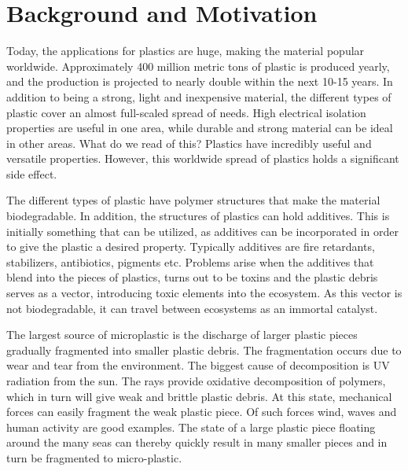 \section{Background and Motivation}


Today, the applications for plastics are huge, making the material popular worldwide. %
Approximately 400 million metric tons of plastic is produced yearly, and the production is projected to nearly double within the next 10-15 years. %
In addition to being a strong, light and inexpensive material, the different types of plastic cover an almost full-scaled spread of needs. High electrical isolation properties are useful in one area, while durable and strong material can be ideal in other areas. What do we read of this? Plastics have incredibly useful and versatile properties. However, this worldwide spread of plastics holds a significant side effect. 

The different types of plastic have polymer structures that make the material biodegradable. In addition, the structures of plastics can hold additives. This is initially something that can be utilized, as additives can be incorporated in order to give the plastic a desired property. Typically additives are fire retardants, stabilizers, antibiotics, pigments etc. %
Problems arise when the additives that blend into the pieces of plastics, turns out to be toxins and the plastic debris serves as a vector, introducing toxic elements into the ecosystem. As this vector is not biodegradable, it can travel between ecosystems as an immortal catalyst.

The largest source of microplastic is the discharge of larger plastic pieces gradually fragmented into smaller plastic debris. The fragmentation occurs due to wear and tear from the environment. The biggest cause of decomposition is UV radiation from the sun. The rays provide oxidative decomposition of polymers, which in turn will give weak and brittle plastic debris. At this state, mechanical forces can easily fragment the weak plastic piece. Of such forces wind, waves and human activity are good examples. The state of a large plastic piece floating around the many seas can thereby quickly result in many smaller pieces and in turn be fragmented to micro-plastic.

